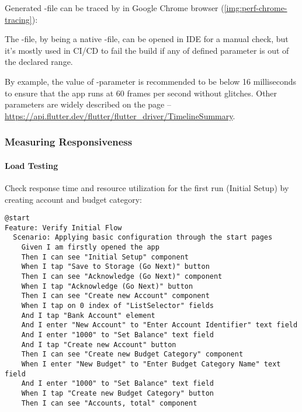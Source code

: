 \noindent Generated -file can be traced by  in Google Chrome browser 
(\cref{img:perf-chrome-tracing}):


\noindent The -file, by being a native -file, can be opened in IDE for a 
manual check, but it's mostly used in CI/CD to fail the build if any of defined parameter is out of the declared range. 

By example, the value of -parameter is recommended to be below 16 milliseconds to 
ensure that the app runs at 60 frames per second without glitches. Other parameters are widely described on the page --
\href{https://api.flutter.dev/flutter/flutter\_driver/TimelineSummary/summaryJson.html}{https://api.flutter.dev/flutter/flutter\_driver/TimelineSummary}.


\subsubsection{Measuring Responsiveness}
\paragraph{Load Testing}
Check response time and resource utilization for the first run (Initial Setup) by creating account and budget 
category:

\begin{lstlisting}[language=cucumber]
@start
Feature: Verify Initial Flow
  Scenario: Applying basic configuration through the start pages
    Given I am firstly opened the app
    Then I can see "Initial Setup" component
    When I tap "Save to Storage (Go Next)" button
    Then I can see "Acknowledge (Go Next)" component
    When I tap "Acknowledge (Go Next)" button
    Then I can see "Create new Account" component
    When I tap on 0 index of "ListSelector" fields
    And I tap "Bank Account" element
    And I enter "New Account" to "Enter Account Identifier" text field
    And I enter "1000" to "Set Balance" text field
    And I tap "Create new Account" button
    Then I can see "Create new Budget Category" component
    When I enter "New Budget" to "Enter Budget Category Name" text field
    And I enter "1000" to "Set Balance" text field
    When I tap "Create new Budget Category" button
    Then I can see "Accounts, total" component
\end{lstlisting}

